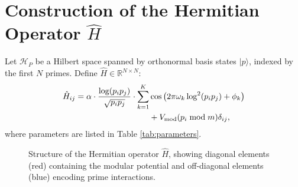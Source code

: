 \section{Construction of the Hermitian Operator \( \hat{H} \)}
Let \( \mathcal{H}_P \) be a Hilbert space spanned by orthonormal basis states \( |p\rangle \), indexed by the first \( N \) primes. Define \( \hat{H} \in \mathbb{R}^{N \times N} \):
\begin{align}
\hat{H}_{ij} = \alpha \cdot \frac{\log(p_i p_j)}{\sqrt{p_i p_j}} \cdot \sum_{k=1}^{K} &\cos\left(2\pi \omega_k \log^2(p_i p_j) + \phi_k\right) \nonumber\\
&+ V_{\text{mod}}(p_i \bmod m)\delta_{ij},
\end{align}
where parameters are listed in Table \ref{tab:parameters}.

\begin{figure}[t]
\centering
{}
\caption{Structure of the Hermitian operator $\hat{H}$, showing diagonal elements (red) containing the modular potential and off-diagonal elements (blue) encoding prime interactions.}
\label{fig:operator_structure}
\end{figure}

